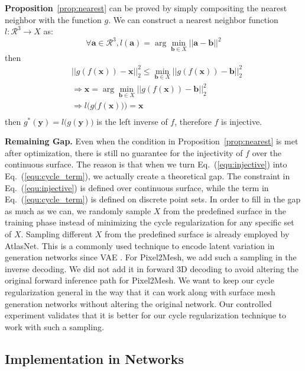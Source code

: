 \textbf{Proposition}~\ref{prop:nearest} can be proved by simply compositing the nearest neighbor with the function $g$. We can construct a nearest neighbor function $l: \mathcal{R}^3 \rightarrow X $ as:
\begin{equation}
\forall \mathbf{a} \in \mathcal{R}^3, l(\mathbf{a}) = \arg\min_{\mathbf{b} \in X} || \mathbf{a} - \mathbf{b} ||^2
\end{equation}
then
\begin{equation}
\begin{aligned}
&|| g(f(\mathbf{x})) - \mathbf{x} ||_2^2 \leq \min_{\mathbf{b} \in X}|| g(f(\mathbf{x})) - \mathbf{b} ||_2^2\\
&\Rightarrow \mathbf{x} = \arg\min_{\mathbf{b} \in X}|| g(f(\mathbf{x})) - \mathbf{b} ||_2^2\\
&\Rightarrow l\Big(g\big(f(\mathbf{x})\big)\Big) = \mathbf{x}\\
\end{aligned}
\end{equation}
then $g^*(\mathbf{y}) = l\big(g(\mathbf{y})\big)$ is the left inverse of $f$, therefore $f$ is injective.

\noindent\textbf{Remaining Gap.}
Even when the condition in Proposition~\ref{prop:nearest} is met after optimization, there is still no guarantee for the injectivity of $f$ over the continuous surface. The reason is that when we turn Eq.~(\ref{equ:injective}) into Eq.~(\ref{equ:cycle_term}), we actually create a theoretical gap. 
The constraint in Eq.~(\ref{equ:injective}) is defined over continuous surface, while the term in  Eq.~(\ref{equ:cycle_term}) is defined on discrete point sets. In order to fill in the gap as much as we can, we randomly sample $X$ from the predefined surface in the training phase instead of minimizing the cycle regularization for any specific set of $X$. Sampling different $X$ from the predefined surface is already employed by AtlasNet. This is a commonly used technique to encode latent variation in generation networks since VAE \cite{VAE}. For Pixel2Mesh, we add such a sampling in the inverse decoding. We did not add it in forward 3D decoding to avoid altering the original forward inference path for Pixel2Mesh. We want to keep our cycle regularization general in the way that it can work along with surface mesh generation networks without altering the original network. Our controlled experiment validates that it is better for our cycle regularization technique to work with such a sampling.

\subsection{Implementation in Networks}

